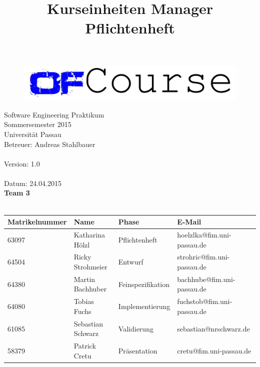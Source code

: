 \documentclass[a4paper]{scrreprt}
\begin{document}
	\thispagestyle{plain}

\begin{titlepage}
    \begin{center}
\begin{figure}[th]
\centering
\includegraphics[width=0.6\linewidth]{logo/name_blau_ofCourse.jpg}
\end{figure}

    	\begin{title}
        	\title{\Huge{\textbf{Kurseinheiten Manager \\ Pflichtenheft\\}}}

		\end{title}
		\hspace{3cm}

        	Software Engineering Praktikum \\
        	Sommersemester 2015\\
        	Universität Passau\\


        	Betreuer: Andreas Stahlbauer\\
        	\hspace{1,5cm}\\
        	Version: 1.0 \\
        	\hspace{1,5cm}\\
        	Datum: 24.04.2015\\[50pt]
        	\textbf{Team 3} \\
            \ \\
    
        
        
        \begin{tabular}{ | l | l | l | l |}
            \hline
            \textbf{Matrikelnummer} & \textbf{Name} & \textbf{Phase} & \textbf{E-Mail}  \\ \hline
            63097 & Katharina Hölzl & Pflichtenheft & hoelzlka@fim.uni-passau.de \\ \hline
            64504 & Ricky Strohmeier& Entwurf & strohric@fim.uni-passau.de  \\ \hline
            64380 & Martin Bachhuber & Feinspezifikation  & bachhube@fim.uni-passau.de \\ \hline
            64080 & Tobias Fuchs & Implementierung  &  fuchstob@fim.uni-passau.de\\ \hline
            61085 & Sebastian Schwarz & Validierung & sebastian@nrschwarz.de \\ \hline  
            58379 & Patrick Cretu  &  Präsentation & cretu@fim.uni-passau.de \\ \hline
        \end{tabular}
        

\end{center}
\end{titlepage}
\end{document}
